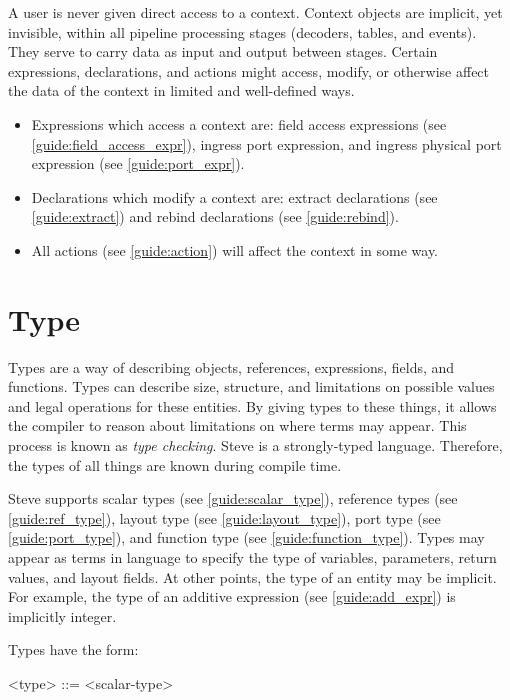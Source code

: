 A user is never given direct access to a context. Context objects are implicit, yet invisible, within all pipeline processing stages (decoders, tables, and events). They serve to carry data as input and output between stages. Certain expressions, declarations, and actions might access, modify, or otherwise affect the data of the context in limited and well-defined ways.

\begin{itemize}
\item Expressions which access a context are: field access expressions (see \ref{guide:field_access_expr}), ingress port expression, and ingress physical port expression (see \ref{guide:port_expr}).

\item Declarations which modify a context are: extract declarations (see \ref{guide:extract}) and rebind declarations (see \ref{guide:rebind}).

\item All actions (see \ref{guide:action}) will affect the context in some way.
\end{itemize}

\section{Type} \label{guide:type}

Types are a way of describing objects, references, expressions, fields, and functions. Types can describe size, structure, and limitations on possible values and legal operations for these entities. By giving types to these things, it allows the compiler to reason about limitations on where terms may appear. This process is known as \textit{type checking}. Steve is a strongly-typed language. Therefore, the types of all things are known during compile time. 

Steve supports scalar types (see \ref{guide:scalar_type}), reference types (see \ref{guide:ref_type}), layout type (see \ref{guide:layout_type}), port type (see \ref{guide:port_type}), and function type (see \ref{guide:function_type}). Types may appear as terms in language to specify the type of variables, parameters, return values, and layout fields. At other points, the type of an entity may be implicit. For example, the type of an additive expression (see \ref{guide:add_expr}) is implicitly integer.

Types have the form:

\begin{minip}
\begin{grammar}
<type> ::=
<scalar-type>
\end{grammar}
\end{minip}

